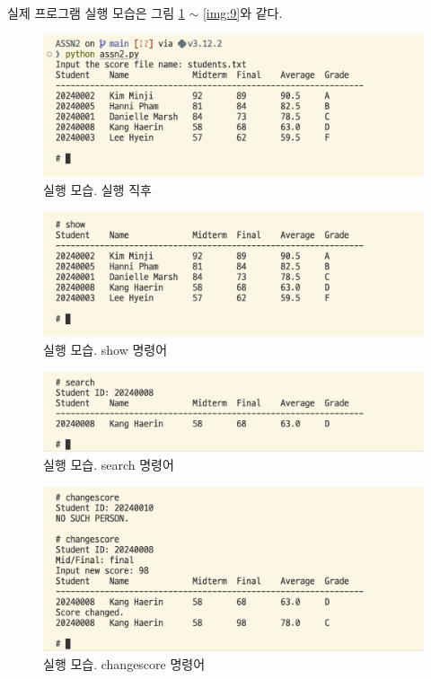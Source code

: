 \documentclass{article}
\begin{document}
실제 프로그램 실행 모습은 그림 \ref{img:1} $\sim$ \ref{img:9}와 같다.

\begin{figure}
  \includegraphics[width=\textwidth]{screenshots/1.png}
  \caption{실행 모습. 실행 직후}
  \label{img:1}
\end{figure}
\begin{figure}
  \includegraphics[width=\textwidth]{screenshots/2.png}
  \caption{실행 모습. show 명령어}
  \label{img:2}
\end{figure}
\begin{figure}
  \includegraphics[width=\textwidth]{screenshots/3.png}
  \caption{실행 모습. search 명령어}
  \label{img:3}
\end{figure}
\begin{figure}
  \includegraphics[width=\textwidth]{screenshots/4.png}
  \caption{실행 모습. changescore 명령어}
  \label{img:4}
\end{figure}
\end{document}
